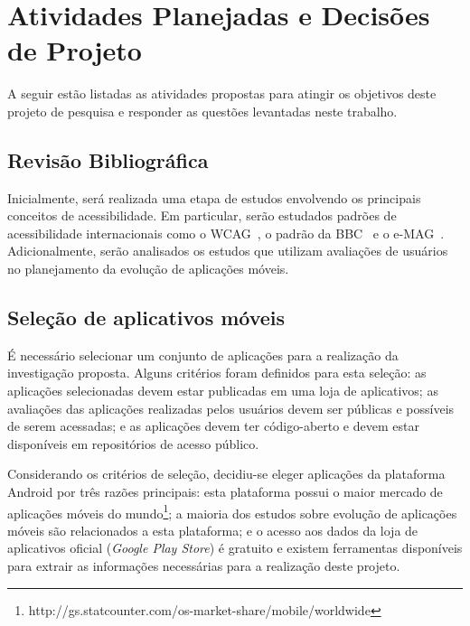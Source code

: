 \section{Atividades Planejadas e Decisões de Projeto}
\label{sec:atividadesgerais}

A seguir estão listadas as atividades propostas para atingir os objetivos deste projeto de pesquisa e responder as questões levantadas neste trabalho.

\subsection{Revisão Bibliográfica}

Inicialmente, será realizada uma etapa de estudos envolvendo os principais conceitos de acessibilidade. Em particular, serão estudados padrões de acessibilidade internacionais como o WCAG~\cite{wcag}, o padrão da BBC~\cite{bbc} e o e-MAG~\cite{emag}. Adicionalmente, serão analisados os estudos que utilizam avaliações de usuários no planejamento da evolução de aplicações móveis.

\subsection{Seleção de aplicativos móveis}
\label{sec:selecaoapps}

É necessário selecionar um conjunto de aplicações para a realização da investigação proposta. Alguns critérios foram definidos para esta seleção: as aplicações selecionadas devem estar publicadas em uma loja de aplicativos; as avaliações das aplicações realizadas pelos usuários devem ser públicas e possíveis de serem acessadas; e as aplicações devem ter código-aberto e devem estar disponíveis em repositórios de acesso público.

Considerando os critérios de seleção, decidiu-se eleger aplicações da plataforma Android por três razões principais: 
esta plataforma possui o maior mercado de aplicações móveis do mundo\footnote{http://gs.statcounter.com/os-market-share/mobile/worldwide}; 
a maioria dos estudos sobre evolução de aplicações móveis são relacionados a esta plataforma; 
e o acesso aos dados da loja de aplicativos oficial (\textit{Google Play Store}) é gratuito e existem ferramentas disponíveis para extrair as informações necessárias para a realização deste projeto.

